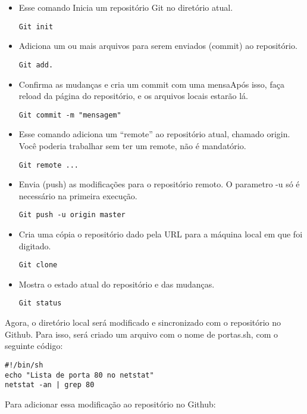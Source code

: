 \begin{itemize}

    \item Esse comando Inicia um repositório Git no 
    diretório atual.
	\begin{lstlisting}
Git init
	\end{lstlisting}
    \item Adiciona um ou mais arquivos para serem 
    enviados (commit) ao repositório.
	\begin{lstlisting}
Git add.
	\end{lstlisting}
    \item Confirma as mudanças e 
    cria um commit com uma mensaApós isso, faça reload da 
    página do repositório, e os arquivos locais estarão lá.
	\begin{lstlisting}
Git commit -m "mensagem"
	\end{lstlisting}    
    \item Esse comando adiciona um “remote” 
    ao repositório atual, chamado origin. Você poderia trabalhar 
    sem ter um remote, não é mandatório.
	\begin{lstlisting}
Git remote ...
	\end{lstlisting}
    \item Envia (push) as modificações 
    para o repositório remoto. O parametro -u só é necessário na 
    primeira execução.
	\begin{lstlisting}
Git push -u origin master
	\end{lstlisting}
    \item Cria uma cópia o repositório dado pela URL 
    para a máquina local em que foi digitado.
	\begin{lstlisting}
Git clone
	\end{lstlisting}
    \item Mostra o estado atual do repositório e 
    das mudanças.
	\begin{lstlisting}
Git status
	\end{lstlisting}
\end{itemize}

Agora, o diretório local será modificado e sincronizado 
com o repositório no Github. Para isso, será criado um 
arquivo com o nome de portas.sh, com o seguinte código:
    \begin{lstlisting}
#!/bin/sh
echo "Lista de porta 80 no netstat"
netstat -an | grep 80
    \end{lstlisting}
 
 Para adicionar essa modificação ao repositório no Github:
 
